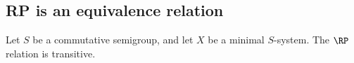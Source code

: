     

    

\subsection{RP is an equivalence relation}

\begin{theorem}
\label{theorem_rp_is_transitive}
\leanok{}
    Let $S$ be a commutative semigroup, and let $X$ be a minimal $S$-system.  The $\RP$ relation is transitive.
\end{theorem}

